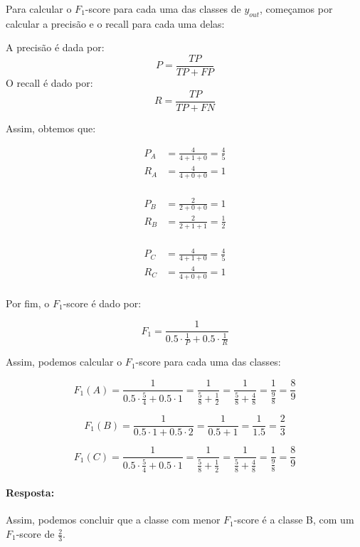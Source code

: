 \documentclass{article}
\begin{document}
Para calcular o $F_1$-score para cada uma das classes de $y_{out}$, começamos por calcular a precisão e o recall para cada uma delas:

A precisão é dada por:
\[ P = \frac{TP}{TP + FP} \]
O recall é dado por:
\[ R = \frac{TP}{TP + FN} \]

Assim, obtemos que:
\begin{center}
  \begin{minipage}{0.3\textwidth}
    \begin{align*}
      P_A &= \frac{4}{4 + 1 + 0} = \frac{4}{5} \\
      R_A &= \frac{4}{4 + 0 + 0} = 1 \\
    \end{align*}
  \end{minipage}
  \begin{minipage}{0.3\textwidth}
    \begin{align*}
      P_B &= \frac{2}{2 + 0 + 0} = 1 \\
      R_B &= \frac{2}{2 + 1 + 1} = \frac{1}{2} \\
    \end{align*}
  \end{minipage}
  \begin{minipage}{0.3\textwidth}
    \begin{align*}
      P_C &= \frac{4}{4 + 1 + 0} = \frac{4}{5} \\
      R_C &= \frac{4}{4 + 0 + 0} = 1 \\
    \end{align*}
  \end{minipage}
\end{center}

Por fim, o $F_1$-score é dado por:

\[ F_1 = \frac{1}{0.5\cdot \frac{1}{P} + 0.5\cdot \frac{1}{R}} \]

Assim, podemos calcular o $F_1$-score para cada uma das classes:

\[ F_1(A) = \frac{1}{0.5\cdot \frac{5}{4} + 0.5\cdot 1} = \frac{1}{\frac{5}{8} + \frac{1}{2}} = \frac{1}{\frac{5}{8} + \frac{4}{8}} = \frac{1}{\frac{9}{8}} = \frac{8}{9} \]

\[ F_1(B) = \frac{1}{0.5\cdot 1 + 0.5\cdot 2} = \frac{1}{0.5 + 1} = \frac{1}{1.5} = \frac{2}{3} \]

\[ F_1(C) = \frac{1}{0.5\cdot \frac{5}{4} + 0.5\cdot 1} = \frac{1}{\frac{5}{8} + \frac{1}{2}} = \frac{1}{\frac{5}{8} + \frac{4}{8}} = \frac{1}{\frac{9}{8}} = \frac{8}{9} \]

\paragraph{Resposta: }
Assim, podemos concluir que a classe com menor $F_1$-score é a classe B, com um $F_1$-score de $\frac{2}{3}$.
\end{document}
